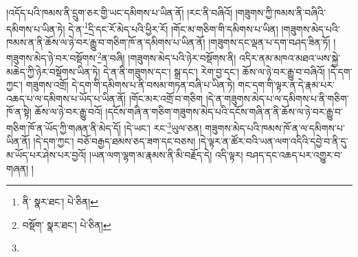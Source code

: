 །འདོད་པའི་ཁམས་ནི་དྲུག་ཅར་གྱི་ཡང་དམིགས་པ་ཡིན་ནོ། །རང་ནི་བཞིའོ། །གཟུགས་ཀྱི་ཁམས་ནི་བཞིའི་དམིགས་པ་ཡིན་ཏེ། དེ་ན་\footnote{ནི་  སྣར་ཐང་།  པེ་ཅིན། }དྲི་དང་རོ་མེད་པའི་ཕྱིར་རོ། །གོང་མ་གཅིག་གི་དམིགས་པ་ཡིན། །གཟུགས་མེད་པའི་ཁམས་ན་ནི་ཆོས་ལ་ཉེ་བར་རྒྱུ་བ་གཅིག་ཁོ་ན་དམིགས་པ་ཡིན་ནོ། །གཟུགས་དང་ལྡན་པ་དག་བཤད་ཟིན་ཏོ། །གཟུགས་མེད་ཉེ་བར་བསྡོགས་\footnote{བསྡོག་  སྣར་ཐང་།  པེ་ཅིན། }ན་བཞི། །གཟུགས་མེད་པའི་ཉེར་བསྡོགས་ནི། འདིར་ནམ་མཁའ་མཐའ་ཡས་སྐྱེ་མཆེད་ཀྱི་ཉེར་བསྡོགས་ཡིན་ཏེ། དེ་ན་ནི་གཟུགས་དང་། སྒྲ་དང་། རེག་བྱ་དང་། ཆོས་ལ་ཉེ་བར་རྒྱུ་བ་བཞིའོ། །དེ་དག་ཀྱང་། གཟུགས་འགྲོ། དེ་དག་གི་དམིགས་པ་ནི་བསམ་གཏན་བཞི་པ་ཡིན་ཏེ། གང་དག་གི་ལྟར་ན་དེ་རྣམ་པར་འཆད་པ་ལ་དམིགས་པ་ཡོད་པ་ཡིན་ནོ། །གོང་མར་འགྲོ་བ་གཅིག །དེ་ན་གཟུགས་མེད་པ་ལ་དམིགས་པ་ནི་གཅིག་ཁོ་ན་སྟེ། ཆོས་ལ་ཉེ་བར་རྒྱུ་བའོ། །དངོས་གཞི་ན་གཅིག་གཟུགས་མེད་པའི་དངོས་གཞི་ན་ནི་ཆོས་ལ་ཉེ་བར་རྒྱུ་བ་གཅིག་ཁོ་ན་ཡོད་ཀྱི་གཞན་ནི་མེད་དོ། །དེ་ཡང་། རང་\footnote{}ཡུལ་ཅན། གཟུགས་མེད་པའི་ཁམས་ཁོ་ན་ལ་དམིགས་པ་ཡིན་ནོ། །དེ་དག་ཀྱང་། བཅོ་བརྒྱད་ཐམས་ཅད་ཟག་དང་བཅས། །དེ་ལྟར་ན་ཚོར་བའི་ཡན་ལག་འདིའི་དབྱེ་བ་ནི་དུ་མ་ཡོད་པར་ཤེས་པར་བྱའོ། །ཡན་ལག་ལྷག་མ་རྣམས་ནི་མི་བརྗོད་དེ། འདི་ལྟར། བཤད་དང་འཆད་པར་འགྱུར་བ་གཞན། །
